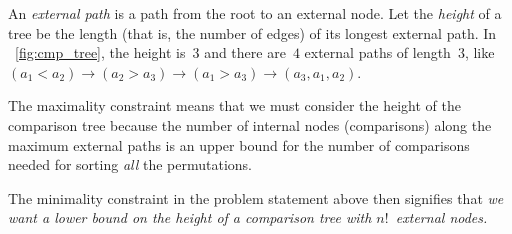 An \emph{external path} is a path
from the root to an external node. Let the \emph{height} of a tree be the length (that is, the number of edges)
of its longest external path. In \fig~\ref{fig:cmp_tree}, the height
is~\(3\) and there are~\(4\) external paths of length~\(3\), like
\((a_1 < a_2) \rightarrow (a_2 > a_3) \rightarrow (a_1 > a_3)
\rightarrow (a_3,a_1,a_2)\).

The maximality constraint means that we must consider the height of
the comparison tree because the number of internal nodes (comparisons)
along the maximum external paths is an upper bound for the number of
comparisons needed for sorting \emph{all} the
permutations.

The minimality constraint in the problem statement above then
signifies that \emph{we want a lower bound on the height of a
  comparison tree with \(n!\)~external nodes.}

